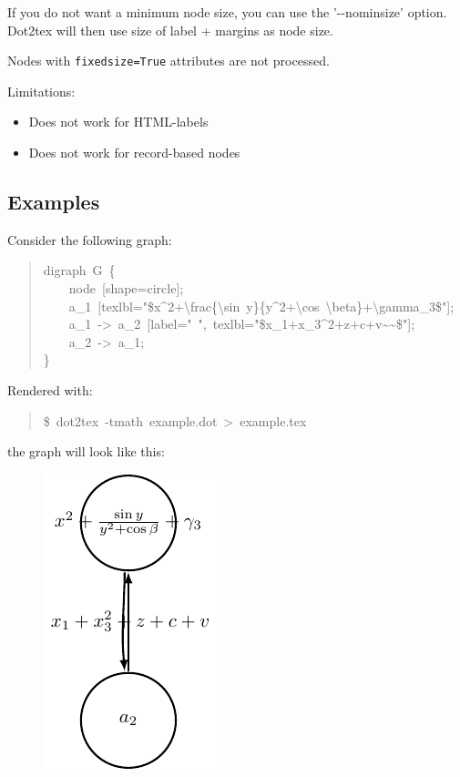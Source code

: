 \documentclass[10pt,a4paper,english]{article}
\begin{document}
If you do not want a minimum node size, you can use the '-{}-nominsize' option. Dot2tex will then use size of label + margins as node size.

Nodes with \texttt{fixedsize=True} attributes are not processed.

Limitations:
\begin{itemize}
\item {} 
Does not work for HTML-labels

\item {} 
Does not work for record-based nodes

\end{itemize}



\hypertarget{examples}{}
\subsection*{Examples}
\label{examples}

Consider the following graph:
\begin{quote}{\ttfamily \raggedright \noindent
digraph~G~{\{}~\\
~~~~node~{[}shape=circle{]};~\\
~~~~a{\_}1~{[}texlbl="{\$}x{\textasciicircum}2+{\textbackslash}frac{\{}{\textbackslash}sin~y{\}}{\{}y{\textasciicircum}2+{\textbackslash}cos~{\textbackslash}beta{\}}+{\textbackslash}gamma{\_}3{\$}"{]};~\\
~~~~a{\_}1~->~a{\_}2~{[}label="~",~texlbl="{\$}x{\_}1+x{\_}3{\textasciicircum}2+z+c+v{\textasciitilde}{\textasciitilde}{\$}"{]};~\\
~~~~a{\_}2~->~a{\_}1;~\\
{\}}
}\end{quote}

Rendered with:
\begin{quote}{\ttfamily \raggedright \noindent
{\$}~dot2tex~-tmath~example.dot~>~example.tex
}\end{quote}

the graph will look like this:
\begin{figure}[H]
\centering

\includegraphics{pdf/preproc1a}
\end{figure}
\end{document}
